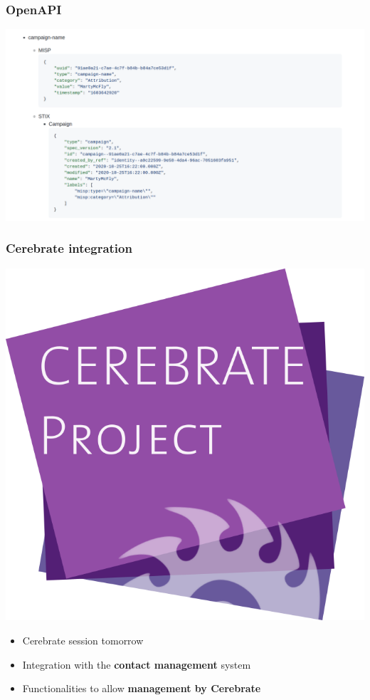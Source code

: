 \begin{frame}
\frametitle{OpenAPI}
\includegraphics[scale=0.4]{images/stix.png}
\end{frame}

\begin{frame}
  \frametitle{Cerebrate integration}
  \begin{center}
  \includegraphics[scale=0.1]{images/cerebrate-logo.png}
  \end{center}
  \begin{itemize}
     \item Cerebrate session tomorrow
     \item Integration with the {\bf contact management} system
     \item Functionalities to allow {\bf management by Cerebrate}
  \end{itemize}
\end{frame}

